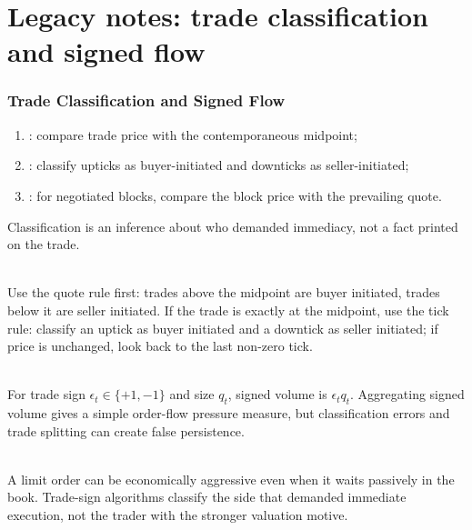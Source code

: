 \documentclass[a4paper,oneside,openany]{book}
\begin{document}
\chapter*{Legacy notes: trade classification and signed flow}

\subsection*{Trade Classification and Signed Flow}

\begin{taxonomy} 
\begin{enumerate}[label=\roman*.]
\setlength{\itemsep}{0pt}
\item {}: compare trade price with the contemporaneous midpoint;
\item {}: classify upticks as buyer-initiated and downticks as seller-initiated;
\item {}: for negotiated blocks, compare the block price with the prevailing quote.
\end{enumerate}
Classification is an inference about who demanded immediacy, not a fact printed on the trade.
\end{taxonomy}

\begin{method} \\
Use the quote rule first: trades above the midpoint are buyer initiated, trades below it are seller initiated. If the trade is exactly at the midpoint, use the tick rule: classify an uptick as buyer initiated and a downtick as seller initiated; if price is unchanged, look back to the last non-zero tick.
\end{method}

\begin{definition} \\
For trade sign $\epsilon_t\in\{+1,-1\}$ and size $q_t$, signed volume is $\epsilon_tq_t$. Aggregating signed volume gives a simple order-flow pressure measure, but classification errors and trade splitting can create false persistence.
\end{definition}

\begin{caveat} \\
A limit order can be economically aggressive even when it waits passively in the book. Trade-sign algorithms classify the side that demanded immediate execution, not the trader with the stronger valuation motive.
\end{caveat}
\end{document}
